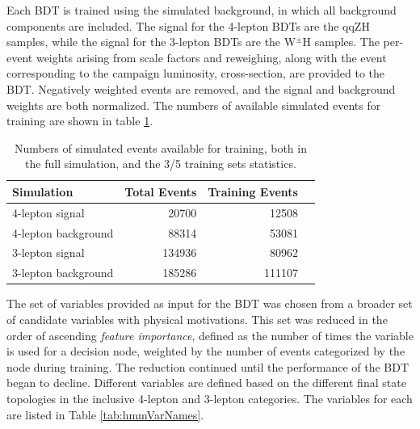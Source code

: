 Each BDT is trained using the simulated background, in which all background components are included.
The signal for the 4-lepton BDTs are the qqZH samples, while the signal for the 3-lepton BDTs are the W$^\pm$H samples.
The per-event weights arising from scale factors and reweighing, along with the event corresponding to the campaign luminosity, cross-section, are provided to the BDT.
Negatively weighted events are removed, and the signal and background weights are both normalized.
The numbers of available simulated events for training are shown in table \ref{tab:hmmSampleStatistics}.

\begin{table}[htbp]
 \caption{Numbers of simulated events available for training, both in the full simulation, and the 3/5 training sets statistics.}
 \begin{center}
\begin{tabular}{l r r r}\toprule
Simulation           & Total Events & Training Events \\
\midrule
4-lepton signal      & 20700        & 12508    \\
4-lepton background  & 88314        & 53081    \\
3-lepton signal      & 134936       & 80962    \\
3-lepton background  & 185286       & 111107   \\
\bottomrule\end{tabular} 
 \end{center}
\label{tab:hmmSampleStatistics}
\end{table}

The set of variables provided as input for the BDT was chosen from a broader set of candidate variables with physical motivations.
This set was reduced in the order of ascending \emph{feature importance}, defined as the number of times the variable is used for a decision node, weighted by the number of events categorized by the node during training.
The reduction continued until the performance of the BDT began to decline.
Different variables are defined based on the different final state topologies in the inclusive 4-lepton and 3-lepton categories.
The variables for each are listed in Table \ref{tab:hmmVarNames}.

